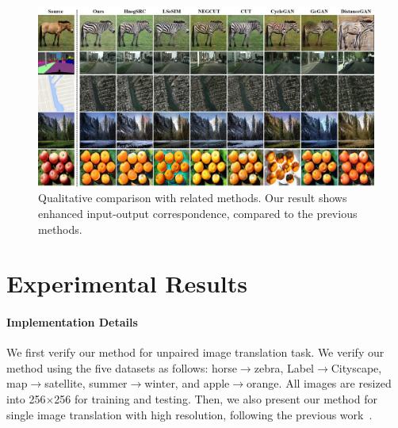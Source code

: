 \documentclass[letterpaper]{article} %
\begin{document}


\begin{figure}[!t]
	\centering
	\includegraphics[width=0.97\linewidth]{figs/result_aaai_2.jpg}
	\caption{Qualitative comparison with related methods. Our result shows enhanced input-output correspondence, compared to the previous methods.}
	\label{fig:result1}
\end{figure}




\section{Experimental Results}



\paragraph{Implementation Details}
We first verify our method for unpaired image translation task. 
We verify our method using the five datasets as follows: horse$\rightarrow$zebra, Label$\rightarrow$Cityscape, map$\rightarrow$satellite, summer$\rightarrow$winter, and {apple$\rightarrow$orange}. All images are resized into 256$\times$256 for training and testing. Then, we also present our method for single image translation with high resolution, following the previous work~\cite{cut}. 
\end{document}
